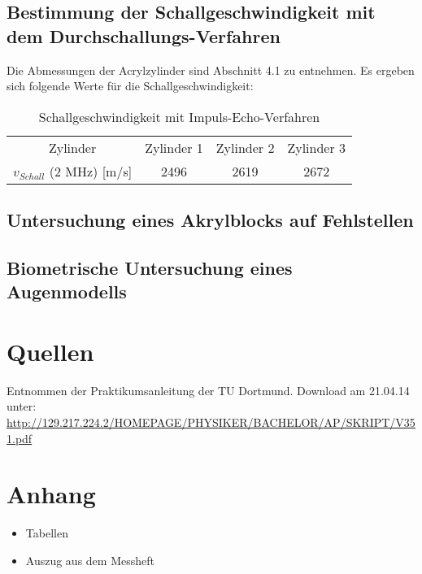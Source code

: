 \documentclass[11pt,ngerman,a4paper]{article}
\begin{document}
\subsection{Bestimmung der Schallgeschwindigkeit mit dem Durchschallungs-Verfahren}

Die Abmessungen der Acrylzylinder sind Abschnitt 4.1 zu entnehmen. Es ergeben sich folgende Werte für die Schallgeschwindigkeit:
\begin{table}[h]
\centering
 \begin{tabular}{|c||c|c|c|}
 Zylinder & Zylinder 1 & Zylinder 2 & Zylinder 3 \\
 $v_{Schall}$ (2 MHz) [m/s] & 2496 & 2619 & 2672 \\
 \end{tabular}
\caption{Schallgeschwindigkeit mit Impuls-Echo-Verfahren}
\end{table}
\subsection{Untersuchung eines Akrylblocks auf Fehlstellen}
\subsection{Biometrische Untersuchung eines Augenmodells}


\section{Quellen}
\begin{enumerate}[{[}1{]}]
\item Entnommen der Praktikumsanleitung \textit{} der TU Dortmund. Download am 21.04.14 unter:\\
 \url{http://129.217.224.2/HOMEPAGE/PHYSIKER/BACHELOR/AP/SKRIPT/V351.pdf}
\end{enumerate}

\section{Anhang}
\begin{itemize}
\item Tabellen
\item Auszug aus dem Messheft
\end{itemize}
\end{document}
